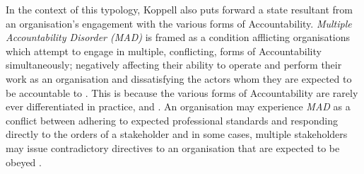
In the context of this typology, Koppell also puts forward a state resultant from an organisation's engagement with the various forms of Accountability. \textit{Multiple Accountability Disorder (MAD)} is framed as a condition afflicting organisations which attempt to engage in multiple, conflicting, forms of Accountability simultaneously; negatively affecting their ability to operate and perform their work as an organisation and dissatisfying the actors whom they are expected to be accountable to \cite{koppell_pathologies_2005}. This is because the various forms of Accountability are rarely ever differentiated in practice, and  \cite{koppell_pathologies_2005}. An organisation may experience \textit{MAD} as a conflict between adhering to expected professional standards and responding directly to the orders of a stakeholder and in some cases, multiple stakeholders may issue contradictory directives to an organisation that are expected to be obeyed \cite{koppell_pathologies_2005}.




%
%
